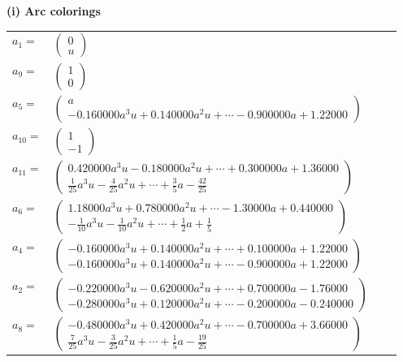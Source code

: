 \documentclass[1p]{elsarticle_modified}
\theoremstyle{definition}
\begin{document}
\flushleft \textbf{(i) Arc colorings}\\
\begin{tabular}{m{7pt} m{180pt} m{7pt} m{180pt} }
\flushright $a_{1}=$&$\begin{pmatrix}0\\u\end{pmatrix}$ \\
\flushright $a_{9}=$&$\begin{pmatrix}1\\0\end{pmatrix}$ \\
\flushright $a_{5}=$&$\begin{pmatrix}a\\-0.160000 a^{3} u+0.140000 a^{2} u+\cdots-0.900000 a+1.22000\end{pmatrix}$ \\
\flushright $a_{10}=$&$\begin{pmatrix}1\\-1\end{pmatrix}$ \\
\flushright $a_{11}=$&$\begin{pmatrix}0.420000 a^{3} u-0.180000 a^{2} u+\cdots+0.300000 a+1.36000\\\frac{1}{25} a^3 u-\frac{4}{25} a^2 u+\cdots+\frac{3}{5} a-\frac{42}{25}\end{pmatrix}$ \\
\flushright $a_{6}=$&$\begin{pmatrix}1.18000 a^{3} u+0.780000 a^{2} u+\cdots-1.30000 a+0.440000\\-\frac{1}{10} a^3 u-\frac{1}{10} a^2 u+\cdots+\frac{1}{2} a+\frac{1}{5}\end{pmatrix}$ \\
\flushright $a_{4}=$&$\begin{pmatrix}-0.160000 a^{3} u+0.140000 a^{2} u+\cdots+0.100000 a+1.22000\\-0.160000 a^{3} u+0.140000 a^{2} u+\cdots-0.900000 a+1.22000\end{pmatrix}$ \\
\flushright $a_{2}=$&$\begin{pmatrix}-0.220000 a^{3} u-0.620000 a^{2} u+\cdots+0.700000 a-1.76000\\-0.280000 a^{3} u+0.120000 a^{2} u+\cdots-0.200000 a-0.240000\end{pmatrix}$ \\
\flushright $a_{8}=$&$\begin{pmatrix}-0.480000 a^{3} u+0.420000 a^{2} u+\cdots-0.700000 a+3.66000\\\frac{7}{25} a^3 u-\frac{3}{25} a^2 u+\cdots+\frac{1}{5} a-\frac{19}{25}\end{pmatrix}$ \\

\end{tabular}
\end{document}
